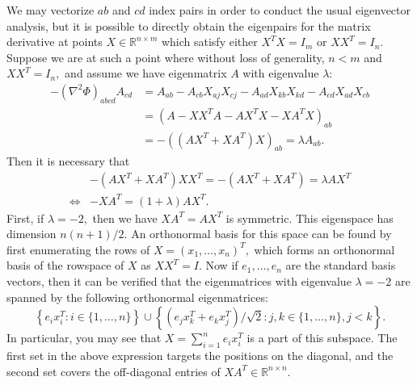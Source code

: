 \documentclass[12pt]{article}
\begin{document}
We may vectorize $ab$ and $cd$ index pairs in order to conduct the usual eigenvector analysis, but it is possible to directly obtain the eigenpairs for the matrix derivative at points $X \in \mathbb{R}^{n \times m}$ which satisfy either $X^T X = I_m$ or $X X^T = I_n.$ Suppose we are at such a point where without loss of generality, $n < m$ and $X X^T = I_n,$ and assume we have eigenmatrix $A$ with eigenvalue $\lambda:$
\begin{align*}
    -{(\nabla^2 \Phi)}_{abcd}A_{cd} &= A_{ab} - A_{cb} X_{aj} X_{cj} - A_{ad} X_{kb} X_{kd} - A_{cd} X_{ad} X_{cb} \\
        &= \left(A - X X^T A - A X^T X - X A^T X\right)_{ab} \\
        &= -\left((A X^T + X A^T) X\right)_{ab} = \lambda A_{ab}.
\end{align*}
Then it is necessary that
\begin{align*}
    &-(A X^T + X A^T) X X^T = -(A X^T + X A^T) = \lambda A X^T \\
    \Longleftrightarrow &-X A^T = (1 + \lambda) A X^T.
\end{align*}
First, if $\lambda = -2,$ then we have $X A^T = A X^T$ is symmetric. This eigenspace has dimension $n(n+1)/2$. An orthonormal basis for this space can be found by first enumerating the rows of $X = (x_1, \ldots, x_n)^T,$ which forms an orthonormal basis of the rowspace of $X$ as $X X^T = I.$ Now if $e_1, \ldots, e_n$ are the standard basis vectors, then it can be verified that the eigenmatrices with eigenvalue $\lambda = -2$ are spanned by the following orthonormal eigenmatrices:
\begin{equation*}
    \left\{ e_i x_i^T : i \in \{ 1, \ldots, n \} \right\} \cup \left\{ (e_j x_k^T + e_k x_j^T) / \sqrt{2} : j, k \in \{ 1, \ldots, n \}, j < k \right\}.
\end{equation*}
In particular, you may see that $X = \sum_{i = 1}^n e_i x_i^T$ is a part of this subspace. The first set in the above expression targets the positions on the diagonal, and the second set covers the off-diagonal entries of $X A^T \in \mathbb{R}^{n \times n}.$
\end{document}
